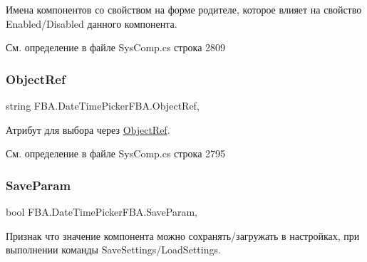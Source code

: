 Имена компонентов со свойством на форме родителе, которое влияет на свойство Enabled/\+Disabled данного компонента. ~\newline




См. определение в файле Sys\+Comp.\+cs строка 2809

\mbox{\label{class_f_b_a_1_1_date_time_picker_f_b_a_ada636905bebb3f709dcdc7950399b0c8}} 
\subsubsection{\texorpdfstring{Object\+Ref}{ObjectRef}}
{\footnotesize\ttfamily string F\+B\+A.\+Date\+Time\+Picker\+F\+B\+A.\+Object\+Ref\hspace{0.3cm}{\ttfamily [get]}, {\ttfamily [set]}}



Атрибут для выбора через \mbox{\hyperlink{class_f_b_a_1_1_object_ref}{Object\+Ref}}. ~\newline




См. определение в файле Sys\+Comp.\+cs строка 2795

\mbox{\label{class_f_b_a_1_1_date_time_picker_f_b_a_ade8ff3e60bb1ddd049dff9a432d0730a}} 
\subsubsection{\texorpdfstring{Save\+Param}{SaveParam}}
{\footnotesize\ttfamily bool F\+B\+A.\+Date\+Time\+Picker\+F\+B\+A.\+Save\+Param\hspace{0.3cm}{\ttfamily [get]}, {\ttfamily [set]}}



Признак что значение компонента можно сохранять/загружать в настройках, при выполнении команды Save\+Settings/\+Load\+Settings. 



